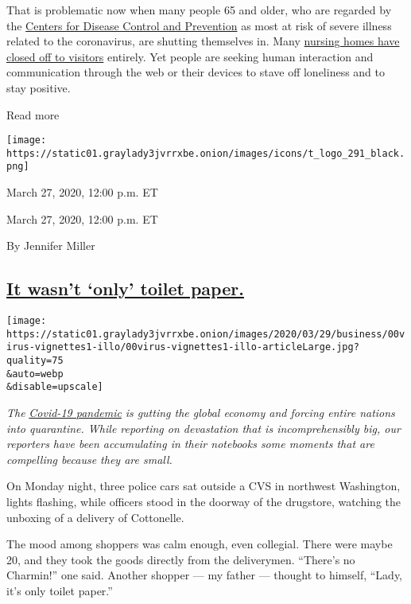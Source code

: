 That is problematic now when many people 65 and older, who are regarded
by the
\href{https://www.cdc.gov/coronavirus/2019-ncov/specific-groups/high-risk-complications/older-adults.html}{Centers
for Disease Control and Prevention} as most at risk of severe illness
related to the coronavirus, are shutting themselves in. Many
\href{https://www.nytimes3xbfgragh.onion/2020/03/10/us/coronavirus-nursing-homes-washington-seattle.html}{nursing
homes have closed off to visitors} entirely. Yet people are seeking
human interaction and communication through the web or their devices to
stave off loneliness and to stay positive.

Read more

\texttt{[image: https://static01.graylady3jvrrxbe.onion/images/icons/t\_logo\_291\_black.png]}

March 27, 2020, 12:00 p.m. ET

March 27, 2020, 12:00 p.m. ET

By Jennifer Miller

\hypertarget{it-wasnt-only-toilet-paper}{%
\subsection{\texorpdfstring{\protect\hyperlink{it-wasnt-only-toilet-paper}{It
wasn't `only' toilet
paper.}}{It wasn't `only' toilet paper.}}\label{it-wasnt-only-toilet-paper}}

\texttt{[image: https://static01.graylady3jvrrxbe.onion/images/2020/03/29/business/00virus-vignettes1-illo/00virus-vignettes1-illo-articleLarge.jpg?quality=75\\\&auto=webp\\\&disable=upscale]}

\emph{The}
\href{https://www.nytimes3xbfgragh.onion/coronavirus}{\emph{Covid-19
pandemic}} \emph{is gutting the global economy and forcing entire
nations into quarantine. While reporting on devastation that is
incomprehensibly big, our reporters have been accumulating in their
notebooks some moments that are compelling because they are small.}

On Monday night, three police cars sat outside a CVS in northwest
Washington, lights flashing, while officers stood in the doorway of the
drugstore, watching the unboxing of a delivery of Cottonelle.

The mood among shoppers was calm enough, even collegial. There were
maybe 20, and they took the goods directly from the deliverymen.
``There's no Charmin!'' one said. Another shopper --- my father ---
thought to himself, ``Lady, it's only toilet paper.''

